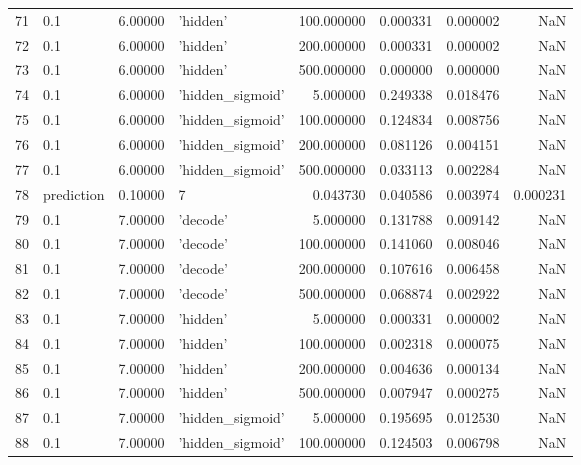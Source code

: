 \documentclass[10pt,a4paper]{article}
\begin{document}
\begin{tabular}{llrlrrrr}
71   &         0.1 &   6.00000 &           'hidden' &  100.000000 &  0.000331 &  0.000002 &       NaN \\
72   &         0.1 &   6.00000 &           'hidden' &  200.000000 &  0.000331 &  0.000002 &       NaN \\
73   &         0.1 &   6.00000 &           'hidden' &  500.000000 &  0.000000 &  0.000000 &       NaN \\
74   &         0.1 &   6.00000 &   'hidden\_sigmoid' &    5.000000 &  0.249338 &  0.018476 &       NaN \\
75   &         0.1 &   6.00000 &   'hidden\_sigmoid' &  100.000000 &  0.124834 &  0.008756 &       NaN \\
76   &         0.1 &   6.00000 &   'hidden\_sigmoid' &  200.000000 &  0.081126 &  0.004151 &       NaN \\
77   &         0.1 &   6.00000 &   'hidden\_sigmoid' &  500.000000 &  0.033113 &  0.002284 &       NaN \\
78   &  prediction &   0.10000 &                  7 &    0.043730 &  0.040586 &  0.003974 &  0.000231 \\
79   &         0.1 &   7.00000 &           'decode' &    5.000000 &  0.131788 &  0.009142 &       NaN \\
80   &         0.1 &   7.00000 &           'decode' &  100.000000 &  0.141060 &  0.008046 &       NaN \\
81   &         0.1 &   7.00000 &           'decode' &  200.000000 &  0.107616 &  0.006458 &       NaN \\
82   &         0.1 &   7.00000 &           'decode' &  500.000000 &  0.068874 &  0.002922 &       NaN \\
83   &         0.1 &   7.00000 &           'hidden' &    5.000000 &  0.000331 &  0.000002 &       NaN \\
84   &         0.1 &   7.00000 &           'hidden' &  100.000000 &  0.002318 &  0.000075 &       NaN \\
85   &         0.1 &   7.00000 &           'hidden' &  200.000000 &  0.004636 &  0.000134 &       NaN \\
86   &         0.1 &   7.00000 &           'hidden' &  500.000000 &  0.007947 &  0.000275 &       NaN \\
87   &         0.1 &   7.00000 &   'hidden\_sigmoid' &    5.000000 &  0.195695 &  0.012530 &       NaN \\
88   &         0.1 &   7.00000 &   'hidden\_sigmoid' &  100.000000 &  0.124503 &  0.006798 &       NaN \\

\end{tabular}
\end{document}
